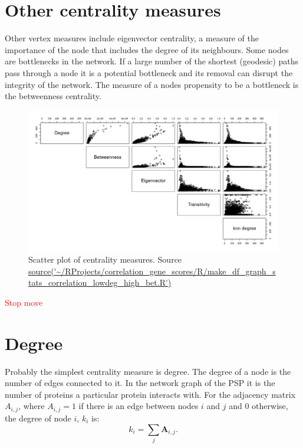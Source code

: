 \section{Other centrality measures}
Other vertex measures include eigenvector centrality, a measure of the importance of the node that includes the degree of its neighbours. \cite{bonacich1987power}  Some nodes are bottlenecks in the network. If a large number of the shortest (geodesic) paths pass through a node it is a potential bottleneck and its removal can disrupt the integrity of the network. The measure of a nodes propensity to be a bottleneck is the betweenness centrality. \cite{freeman1977set} 

\begin{figure}
    \centering
    \includegraphics[width=\textwidth]{images/Rplot_pairs_plot.png}
    \caption{Scatter plot of centrality measures. Source \url{source('~/RProjects/correlation_gene_scores/R/make_df_graph_stats_correlation_lowdeg_high_bet.R')}}
    \label{fig:scatter plot of multiple centrality measures}
\end{figure}

\textcolor{red}{Stop move}
\section{Degree}
\label{sec:degree}

Probably the simplest centrality measure is degree. 
The degree of a node is the number of edges connected to it. In the network graph of the PSP it is the number of proteins a particular protein interacts with.
For the adjacency matrix $A_{i,j}$, where $A_{i,j}=1$  if there is an edge between nodes $i$ and $j$ and 0 otherwise, the degree of node $i$, $k_i$ is\cite{boccaletti2006complex}:
\begin{equation}
k_i = \sum_j \mathbf{A}_{i,j}.
\label{Equation:Degree_from_adjacency}
\end{equation}

